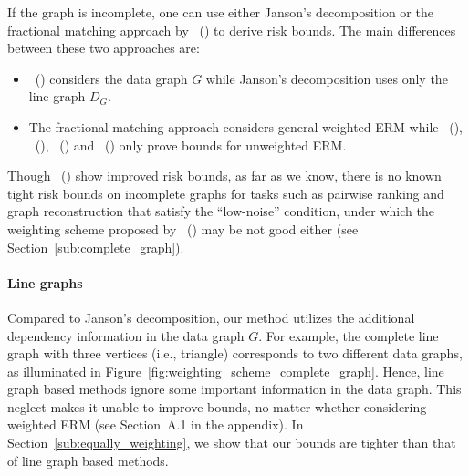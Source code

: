 \documentclass[letterpaper]{article} %
\newcommand{\problemabbr}{\textnormal{C}\textsc{lanet}}
\newcommand{\citet}[1]{\citeauthor{#1}\ (\citeyear{#1})}
\newcommand{\citep}[3]{(#1\ \citeauthor{#3}\ \citeyear{#3},\ #2)}
\begin{document}
If the graph is incomplete, one can use either Janson's decomposition \cite{janson2004large,Usunier2005,ralaivola2009chromatic,DBLP:conf/icml/RalaivolaA15} or the fractional matching approach by \citet{wang2017learning} to derive risk bounds. 
The main differences between these two approaches are: 
\begin{itemize}
  \item \citet{wang2017learning} considers the data graph $G$ while Janson's decomposition uses only the line graph $D_G$. 
  \item The fractional matching approach considers general weighted ERM while \citet{janson2004large}, \citet{Usunier2005}, \citet{ralaivola2009chromatic} and \citet{DBLP:conf/icml/RalaivolaA15} only prove bounds for unweighted ERM.
\end{itemize}
Though \citet{wang2017learning} show improved risk bounds, as far as we know, there is no known tight risk bounds on incomplete graphs for tasks such as pairwise ranking and graph reconstruction that satisfy the ``low-noise'' condition, under which the weighting scheme proposed by \citet{wang2017learning} may be not good either (see Section~\ref{sub:complete_graph}).



\paragraph{Line graphs} 
Compared to Janson's decomposition, our method utilizes the additional dependency information in the data graph $G$. 
For example, the complete line graph with three vertices (i.e., triangle) corresponds to two different data graphs, as illuminated in Figure~\ref{fig:weighting_scheme_complete_graph}.
Hence, line graph based methods ignore some important information in the data graph. 
This neglect makes it unable to improve bounds, no matter whether considering weighted ERM (see Section~A.1 in the appendix). 
In Section~\ref{sub:equally_weighting}, we show that our bounds are tighter than that of line graph based methods. 
\end{document}
